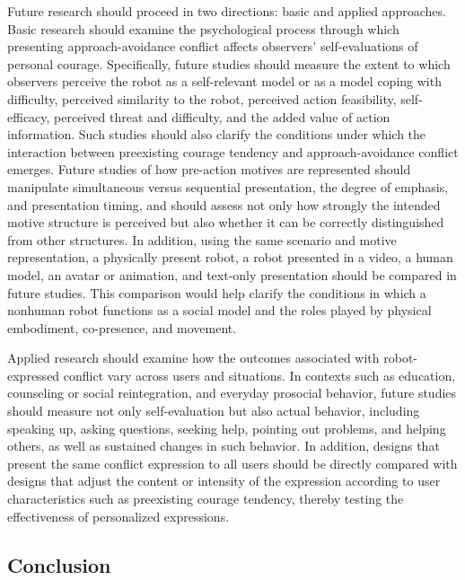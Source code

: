 Future research should proceed in two directions: basic and applied
approaches. Basic research should examine the psychological process
through which presenting approach-avoidance conflict affects observers'
self-evaluations of personal courage. Specifically, future studies
should measure the extent to which observers perceive the robot as a
self-relevant model or as a model coping with difficulty, perceived
similarity to the robot, perceived action feasibility, self-efficacy,
perceived threat and difficulty, and the added value of action
information. Such studies should also clarify the conditions under which
the interaction between preexisting courage tendency and
approach-avoidance conflict emerges. Future studies of how pre-action
motives are represented should manipulate simultaneous versus sequential
presentation, the degree of emphasis, and presentation timing, and
should assess not only how strongly the intended motive structure is
perceived but also whether it can be correctly distinguished from other
structures. In addition, using the same scenario and motive
representation, a physically present robot, a robot presented in a
video, a human model, an avatar or animation, and text-only presentation
should be compared in future studies. This comparison would help clarify
the conditions in which a nonhuman robot functions as a social model and
the roles played by physical embodiment, co-presence, and movement.

Applied research should examine how the outcomes associated with
robot-expressed conflict vary across users and situations. In contexts
such as education, counseling or social reintegration, and everyday
prosocial behavior, future studies should measure not only
self-evaluation but also actual behavior, including speaking up, asking
questions, seeking help, pointing out problems, and helping others, as
well as sustained changes in such behavior. In addition, designs that
present the same conflict expression to all users should be directly
compared with designs that adjust the content or intensity of the
expression according to user characteristics such as preexisting courage
tendency, thereby testing the effectiveness of personalized expressions.

\subsection{Conclusion}\label{conclusion}

